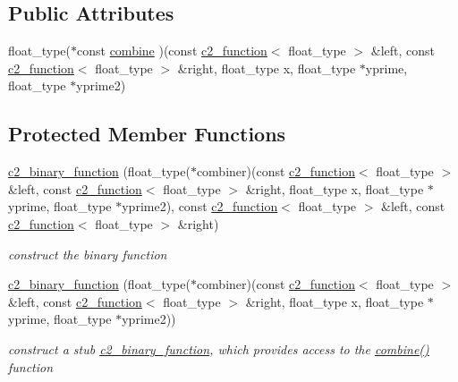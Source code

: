 \subsection*{Public Attributes}
\begin{DoxyCompactItemize}
\item 
float\+\_\+type($\ast$const \hyperlink{classc2__binary__function_a03189b157a02b97b2f885196616c01a0}{combine} )(const \hyperlink{classc2__function}{c2\+\_\+function}$<$ float\+\_\+type $>$ \&left, const \hyperlink{classc2__function}{c2\+\_\+function}$<$ float\+\_\+type $>$ \&right, float\+\_\+type x, float\+\_\+type $\ast$yprime, float\+\_\+type $\ast$yprime2)
\end{DoxyCompactItemize}
\subsection*{Protected Member Functions}
\begin{DoxyCompactItemize}
\item 
\hyperlink{classc2__binary__function_a1daf580ba04ae495309f9c83bd615f68}{c2\+\_\+binary\+\_\+function} (float\+\_\+type($\ast$combiner)(const \hyperlink{classc2__function}{c2\+\_\+function}$<$ float\+\_\+type $>$ \&left, const \hyperlink{classc2__function}{c2\+\_\+function}$<$ float\+\_\+type $>$ \&right, float\+\_\+type x, float\+\_\+type $\ast$yprime, float\+\_\+type $\ast$yprime2), const \hyperlink{classc2__function}{c2\+\_\+function}$<$ float\+\_\+type $>$ \&left, const \hyperlink{classc2__function}{c2\+\_\+function}$<$ float\+\_\+type $>$ \&right)
\begin{DoxyCompactList}\small\item\em construct the binary function \end{DoxyCompactList}\item 
\hyperlink{classc2__binary__function_a99809843f818ae9c451a0339b0f46bdc}{c2\+\_\+binary\+\_\+function} (float\+\_\+type($\ast$combiner)(const \hyperlink{classc2__function}{c2\+\_\+function}$<$ float\+\_\+type $>$ \&left, const \hyperlink{classc2__function}{c2\+\_\+function}$<$ float\+\_\+type $>$ \&right, float\+\_\+type x, float\+\_\+type $\ast$yprime, float\+\_\+type $\ast$yprime2))
\begin{DoxyCompactList}\small\item\em construct a \textquotesingle{}stub\textquotesingle{} \hyperlink{classc2__binary__function}{c2\+\_\+binary\+\_\+function}, which provides access to the \hyperlink{classc2__binary__function_a03189b157a02b97b2f885196616c01a0}{combine()} function \end{DoxyCompactList}\end{DoxyCompactItemize}
